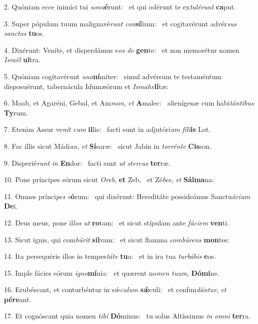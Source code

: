 2. Quóniam ecce inimíci tui \textit{so}\textit{nu}\textbf{é}runt: \ast\  et qui odérunt te ex\textit{tu}\textit{lé}\textit{runt} \textbf{ca}put.\

3. Super pópulum tuum malignavé\textit{runt} \textit{con}\textbf{sí}lium: \ast\  et cogitavérunt advér\textit{sus} \textit{sanc}\textit{tos} \textbf{tu}os.\

4. Dixérunt: Veníte, et disperdámus e\textit{os} \textit{de} \textbf{gen}te: \ast\  et non memorétur nomen \textit{Is}\textit{ra}\textit{ël} \textbf{ul}tra.\

5. Quóniam cogitavérunt \textit{u}\textit{na}\textbf{ní}miter: \ast\  simul advérsum te testaméntum disposuérunt, tabernácula Idumæórum et \textit{Is}\textit{ma}\textit{he}\textbf{lí}tæ:\

6. Moab, et Agaréni, Gebal, et Am\textit{mon}, \textit{et} \textbf{A}malec: \ast\  alienígenæ cum habi\textit{tán}\textit{ti}\textit{bus} \textbf{Ty}rum.\

7. Etenim Assur ve\textit{nit} \textit{cum} \textbf{il}lis: \ast\  facti sunt in adjutóri\textit{um} \textit{fí}\textit{li}\textbf{is} Lot.\

8. Fac illis sicut Mádi\textit{an}, \textit{et} \textbf{Sí}saræ: \ast\  sicut Jabin in \textit{tor}\textit{rén}\textit{te} \textbf{Cis}son.\

9. Disperié\textit{runt} \textit{in} \textbf{En}dor: \ast\  facti sunt \textit{ut} \textit{ster}\textit{cus} \textbf{ter}ræ.\

10. Pone príncipes eórum sicut \textit{O}\textit{reb}, \textbf{et} Zeb, \ast\  et Zé\textit{be}\textit{e}, \textit{et} \textbf{Sál}\textbf{ma}na:\

11. Omnes prínci\textit{pes} \textit{e}\textbf{ó}rum: \ast\  qui dixérunt: Hereditáte possideámus Sanctu\textit{á}\textit{ri}\textit{um} \textbf{De}i.\

12. Deus meus, pone il\textit{los} \textit{ut} \textbf{ro}tam: \ast\  et sicut stípulam ante \textit{fá}\textit{ci}\textit{em} \textbf{ven}ti.\

13. Sicut ignis, qui com\textit{bú}\textit{rit} \textbf{sil}vam: \ast\  et sicut flamma \textit{com}\textit{bú}\textit{rens} \textbf{mon}tes:\

14. Ita persequéris illos in tempes\textit{tá}\textit{te} \textbf{tu}a: \ast\  et in ira tua \textit{tur}\textit{bá}\textit{bis} \textbf{e}os.\

15. Imple fácies eórum \textit{i}\textit{gno}\textbf{mí}nia: \ast\  et quærent no\textit{men} \textit{tu}\textit{um}, \textbf{Dó}\textbf{mi}ne.\

16. Erubéscant, et conturbéntur in sǽ\textit{cu}\textit{lum} \textbf{sǽ}culi: \ast\  et confun\textit{dán}\textit{tur}, \textit{et} \textbf{pér}\textbf{e}ant.\

17. Et cognóscant quia nomen \textit{ti}\textit{bi} \textbf{Dó}minus: \ast\  tu solus Altíssimus \textit{in} \textit{om}\textit{ni} \textbf{ter}ra.\

